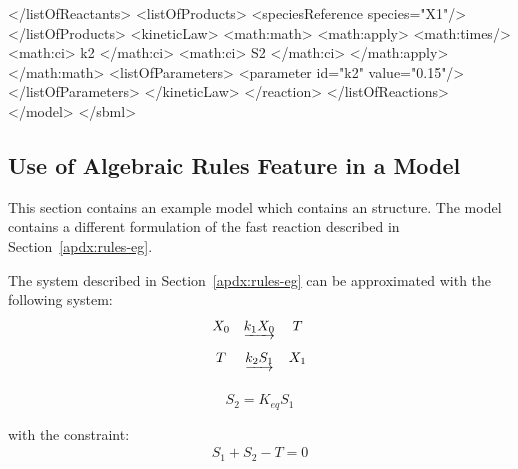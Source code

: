 \documentclass[10pt]{cekarticle}
\begin{document}
\begin{example}
                </listOfReactants>
                <listOfProducts>
                    <speciesReference species="X1"/>
                </listOfProducts>
                <kineticLaw>
                    <math:math>
                        <math:apply>
                            <math:times/>
                            <math:ci> k2 </math:ci>
                            <math:ci> S2 </math:ci>
                        </math:apply>
                    </math:math>
                    <listOfParameters>
                        <parameter id="k2" value="0.15"/>
                    </listOfParameters>
                </kineticLaw>
            </reaction>
        </listOfReactions>
    </model>
</sbml>
\end{example}

\subsection{Use of Algebraic Rules Feature in a Model}
\label{sec:algeraiceg}

This section contains an example model which contains an
 structure.  The model contains a different
formulation of the fast reaction described in
Section~\ref{apdx:rules-eg}.

The system described in Section~\ref{apdx:rules-eg} can be
approximated with the following system:
\begin{equation*}
  \begin{array}{@{}ccc@{}}
    X_0 & \underrightarrow{k_1 X_0} & T \\ \\[-4pt]
    T & \underrightarrow{k_2 S_1} & X_1\\ \\[-4pt]
  \end{array}
\end{equation*}
\begin{equation*}
  \begin{array}{ll}
    S_2 = K_{eq} S_1\\ \\[-4pt]
  \end{array}
\end{equation*}
with the constraint:
\begin{equation*}
  \begin{array}{ll}
    S_1 + S_2 - T = 0\\ \\[-4pt]
  \end{array}
\end{equation*}
\end{document}
